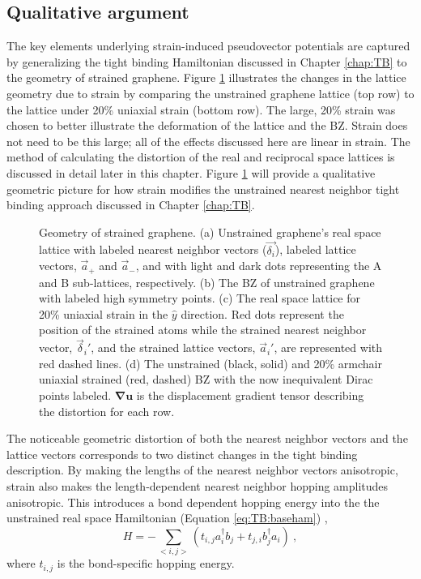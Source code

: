 \subsection{Qualitative argument}
The key elements underlying strain-induced pseudovector potentials are captured by generalizing the tight binding Hamiltonian discussed in Chapter \ref{chap:TB} to the geometry of strained graphene.
Figure \ref{fig:PVP:lattice} illustrates the changes in the lattice geometry due to strain by comparing the unstrained graphene lattice (top row) to the lattice under 20\% uniaxial strain (bottom row).
The large, 20\% strain was chosen to better illustrate the deformation of the lattice and the BZ.
Strain does not need to be this large; all of the effects discussed here are linear in strain.
The method of calculating the distortion of the real and reciprocal space lattices is discussed in detail later in this chapter.
Figure \ref{fig:PVP:lattice} will provide a qualitative geometric picture for how strain modifies the unstrained nearest neighbor tight binding approach discussed in Chapter \ref{chap:TB}.

\begin{figure}
  
  \caption[Geometry of strained graphene]{\label{fig:PVP:lattice} Geometry of strained graphene.  (a) Unstrained graphene's real space lattice with labeled nearest neighbor vectors ($\vec{\delta_i}$), labeled lattice vectors, $\vec{a}_+$ and  $\vec{a}_-$, and with light and dark dots representing the A and B sub-lattices, respectively. (b) The BZ of unstrained graphene with labeled high symmetry points. (c) The real space lattice for 20\% uniaxial strain in the $\hat{y}$ direction.  Red dots represent the position of the strained atoms while the strained nearest neighbor vector, $\vec{\delta}_i'$, and the strained lattice vectors, $\vec{a}_i'$, are represented with red dashed lines.  (d) The unstrained (black, solid) and 20\% armchair uniaxial strained (red, dashed) BZ with the now inequivalent Dirac points labeled.  $\bm{\nabla u}$ is the displacement gradient tensor describing the distortion for each row.}
\end{figure}

The noticeable geometric distortion of both the nearest neighbor vectors and the lattice vectors corresponds to two distinct changes in the tight binding description.
By making the lengths of the nearest neighbor vectors anisotropic, strain also makes the length-dependent nearest neighbor hopping amplitudes anisotropic.
This introduces a bond dependent hopping energy into the the unstrained real space Hamiltonian (Equation \ref{eq:TB:baseham}) \cite{Hasegawa2006},
\begin{equation}
  H=-\sum_{<i,j>} \left( t_{i,j} a_i^{\dagger} b_j + t_{j,i} b_j^{\dagger} a_i \right) \ ,
  \label{eq:PVP:RealSpace}
\end{equation}
where $t_{i,j}$ is the bond-specific hopping energy.

